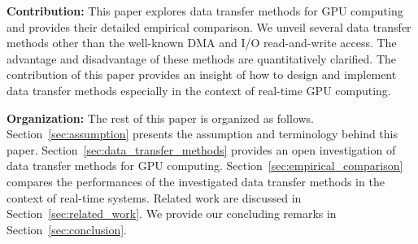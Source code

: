 \textbf{Contribution:}
This paper explores data transfer methods for GPU computing and
provides their detailed empirical comparison.
We unveil several data transfer methods other than the well-known DMA
and I/O read-and-write access.
The advantage and disadvantage of these methods are quantitatively
clarified.
%
%
The contribution of this paper provides an insight of how to design and
implement data transfer methods especially in the context of real-time
GPU computing.

\textbf{Organization:}
The rest of this paper is organized as follows.
Section~\ref{sec:assumption} presents the assumption and terminology
behind this paper.
Section~\ref{sec:data_transfer_methods} provides an open investigation
of data transfer methods for GPU computing.
Section~\ref{sec:empirical_comparison} compares the performances of the
investigated data transfer methods in the context of real-time systems.
Related work are discussed in Section~\ref{sec:related_work}.
We provide our concluding remarks in Section~\ref{sec:conclusion}.
